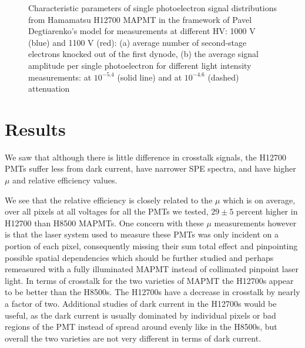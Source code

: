 \documentclass[5p,times,preprint]{elsarticle}
\begin{document}
\begin{figure}[b]
	\caption{Characteristic parameters of single photoelectron signal distributions from Hamamatsu H12700 MAPMT in the framework of Pavel Degtiarenko's model for measurements at different HV: 1000 V (blue) and 1100 V (red):
		(a) average number of second-stage electrons knocked out of the first dynode,
		(b) the average signal amplitude per single photoelectron for different light intensity measurements: at $10^{-5.4}$ (solid line) and at $10^{-4.6}$ (dashed) attenuation}
	\label{fig:characteristicPars}
\end{figure}





\section{Results}

We saw that although there is little difference in crosstalk signals, the H12700 PMTs suffer less from dark current, have narrower SPE spectra, and have higher $\mu$ and relative efficiency values.


We see that the relative efficiency is closely related to the $\mu$ which is on average, over all pixels at all voltages for all the PMTs we tested, $29\pm5$ percent higher in H12700 than H8500 MAPMTs. One concern with these $\mu$ measurements however is that the laser system used to measure these PMTs was only incident on a portion of each pixel, consequently missing their sum total effect and pinpointing possible spatial dependencies which should be further studied and perhaps remeasured with a fully illuminated MAPMT instead of collimated pinpoint laser light. In terms of crosstalk for the two varieties of MAPMT the H12700s appear to be better than the H8500s. The H12700s have a decrease in crosstalk by nearly a factor of two. Additional studies of dark current in the H12700s would be useful, as the dark current is usually dominated by individual pixels or bad regions of the PMT instead of spread around evenly like in the H8500s, but overall the two varieties are not very different in terms of dark current.



\end{document}
